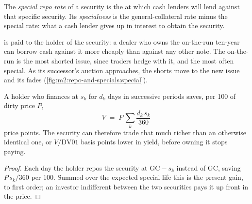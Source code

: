 \begin{definition}\label{def:m2:repo-and-specials:special}
The \emph{special repo rate} of a security is the
 at which cash lenders will lend against that specific security. Its
\emph{specialness} is the general-collateral rate minus the
special rate: what a cash lender gives up in interest to obtain the security.
\end{definition}

 is paid to the holder of the security: a dealer who owns the
on-the-run ten-year can borrow cash against it more cheaply than against any
other note. The on-the-run is the most shorted issue, since traders hedge with
it, and the most often special. As its successor's auction approaches, the
shorts move to the new issue and its  fades
(\cref{fig:m2:repo-and-specials:special}).

\begin{proposition}\label{prop:m2:repo-and-specials:value}
A holder who finances at  $s_k$ for $d_k$ days in successive
periods saves, per 100 of dirty price $P$,
\[
V \;=\; P\,\sum_k \frac{d_k\,s_k}{360}
\]
price points. The security can therefore trade that much richer than an
otherwise identical one, or $V/\mathrm{DV01}$ basis points lower in yield,
before owning it stops paying.
\end{proposition}
\begin{proof}
Each day the holder repos the security at $\mathrm{GC} - s_k$ instead of GC,
saving $P\,s_k/360$ per 100. Summed over the expected special life this is the
present gain, to first order; an investor indifferent between the two
securities pays it up front in the price.
\end{proof}

